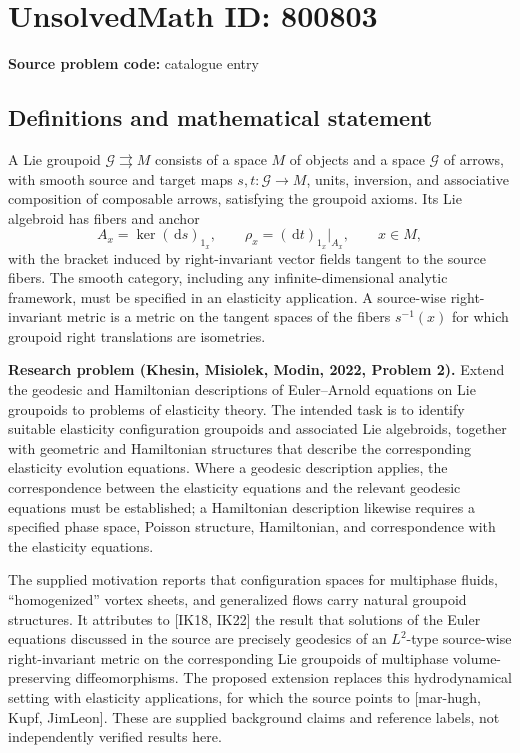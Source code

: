 \documentclass[11pt]{article}
\newcommand{\dd}{\,\mathrm{d}}
\begin{document}
\section*{UnsolvedMath ID: 800803}
\textbf{Source problem code:} catalogue entry
\subsection{Definitions and mathematical statement}
A Lie groupoid \(\mathcal G\rightrightarrows M\) consists of a space \(M\) of objects and a space \(\mathcal G\) of arrows, with smooth source and target maps \(s,t:\mathcal G\to M\), units, inversion, and associative composition of composable arrows, satisfying the groupoid axioms. Its Lie algebroid has fibers and anchor
\[
A_x=\ker(\dd s)_{1_x},\qquad \rho_x=(\dd t)_{1_x}|_{A_x},\qquad x\in M,
\]
with the bracket induced by right-invariant vector fields tangent to the source fibers. The smooth category, including any infinite-dimensional analytic framework, must be specified in an elasticity application. A source-wise right-invariant metric is a metric on the tangent spaces of the fibers \(s^{-1}(x)\) for which groupoid right translations are isometries.

\textbf{Research problem (Khesin, Misiolek, Modin, 2022, Problem 2).} Extend the geodesic and Hamiltonian descriptions of Euler--Arnold equations on Lie groupoids to problems of elasticity theory. The intended task is to identify suitable elasticity configuration groupoids and associated Lie algebroids, together with geometric and Hamiltonian structures that describe the corresponding elasticity evolution equations. Where a geodesic description applies, the correspondence between the elasticity equations and the relevant geodesic equations must be established; a Hamiltonian description likewise requires a specified phase space, Poisson structure, Hamiltonian, and correspondence with the elasticity equations.

The supplied motivation reports that configuration spaces for multiphase fluids, ``homogenized'' vortex sheets, and generalized flows carry natural groupoid structures. It attributes to [IK18, IK22] the result that solutions of the Euler equations discussed in the source are precisely geodesics of an \(L^2\)-type source-wise right-invariant metric on the corresponding Lie groupoids of multiphase volume-preserving diffeomorphisms. The proposed extension replaces this hydrodynamical setting with elasticity applications, for which the source points to [mar-hugh, Kupf, JimLeon]. These are supplied background claims and reference labels, not independently verified results here.
\end{document}
